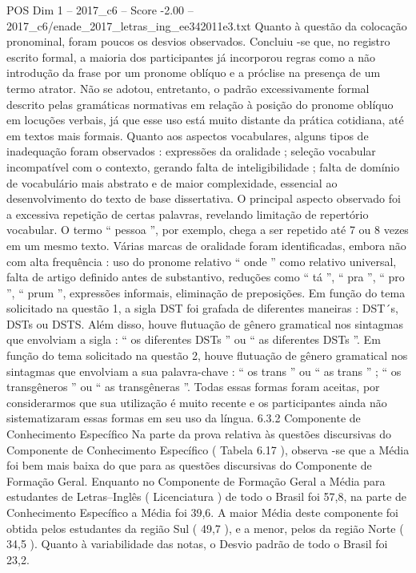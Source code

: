 \begin{textsample}{POS Dim 1 – 2017\_c6 – Score -2.00 – 2017\_c6/enade\_2017\_letras\_ing\_ee342011e3.txt}
Quanto à questão da colocação pronominal, foram poucos os desvios observados.
Concluiu -se que, no registro escrito formal, a maioria dos participantes já incorporou regras como a não introdução da frase por um pronome oblíquo e a próclise na presença de um termo atrator.
Não se adotou, entretanto, o padrão excessivamente formal descrito pelas gramáticas normativas em relação à posição do pronome oblíquo em locuções verbais, já que esse uso está muito distante da prática cotidiana, até em textos mais formais.
Quanto aos aspectos vocabulares, alguns tipos de inadequação foram observados : expressões da oralidade ; seleção vocabular incompatível com o contexto, gerando falta de inteligibilidade ; falta de domínio de vocabulário mais abstrato e de maior complexidade, essencial ao desenvolvimento do texto de base dissertativa.
O principal aspecto observado foi a excessiva repetição de certas palavras, revelando limitação de repertório vocabular.
O termo “ pessoa ”, por exemplo, chega a ser repetido até 7 ou 8 vezes em um mesmo texto.
Várias marcas de oralidade foram identificadas, embora não com alta frequência : uso do pronome relativo “ onde ” como relativo universal, falta de artigo definido antes de substantivo, reduções como “ tá ”, “ pra ”, “ pro ”, “ prum ”, expressões informais, eliminação de preposições.
Em função do tema solicitado na questão 1, a sigla DST foi grafada de diferentes maneiras : DST´s, DSTs ou DSTS.
Além disso, houve flutuação de gênero gramatical nos sintagmas que envolviam a sigla : “ os diferentes DSTs ” ou “ as diferentes DSTs ”.
Em função do tema solicitado na questão 2, houve flutuação de gênero gramatical nos sintagmas que envolviam a sua palavra-chave : “ os trans ” ou “ as trans ” ; “ os transgêneros ” ou “ as transgêneras ”.
Todas essas formas foram aceitas, por considerarmos que sua utilização é muito recente e os participantes ainda não sistematizaram essas formas em seu uso da língua. 6.3.2 Componente de Conhecimento Específico Na parte da prova relativa às questões discursivas do Componente de Conhecimento Específico ( Tabela 6.17 ), observa -se que a Média foi bem mais baixa do que para as questões discursivas do Componente de Formação Geral.
Enquanto no Componente de Formação Geral a Média para estudantes de Letras–Inglês ( Licenciatura ) de todo o Brasil foi 57,8, na parte de Conhecimento Específico a Média foi 39,6.
A maior Média deste componente foi obtida pelos estudantes da região Sul ( 49,7 ), e a menor, pelos da região Norte ( 34,5 ).
Quanto à variabilidade das notas, o Desvio padrão de todo o Brasil foi 23,2.

\end{textsample}
